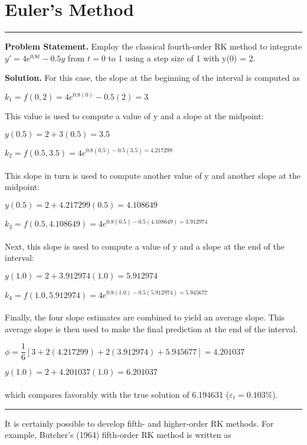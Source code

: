 \documentclass[../main.tex]{subfiles}
\begin{document}
\vspace{0,3in}
\section{Euler's Method}
\vspace{0,1in}
\hrule
\vspace{0,1in}
\textbf{Problem Statement.} Employ the classical fourth-order RK method to integrate $y' = 4e^{0.8t} - 0.5y$ from $t=0$ to 1 using a step size of 1 with y(0) = 2.

\vspace{0.2in}
\textbf{Solution.}  For this case, the slope at the beginning of the interval is computed as 

$k_1 = f(0,2) = 4e^{0.8(0)} - 0.5(2) = 3$

This value is used to compute a value of y and a slope at the midpoint:

$y(0.5) = 2 + 3(0.5) = 3.5$

$k_2 = f(0.5, 3.5) = 4e^{0.8(0.5) - 0.5(3.5) = 4.217299}$\\
\\
This slope in turn is used to compute another value of y and another slope at the midpoint:

$y(0.5) = 2 + 4.217299(0.5) = 4.108649$

$k_3 = f (0.5, 4.108649) = 4e^{0.8(0.5) − 0.5(4.108649) = 3.912974}$\\
\\
Next, this slope is used to compute a value of y and a slope at the end of the interval:

$y(1.0) = 2 + 3.912974(1.0) = 5.912974$

$k_4 = f (1.0, 5.912974) = 4e^{0.8(1.0) - 0.5(5.912974) = 5.945677}$\\
\\
Finally, the four slope estimates are combined to yield an average slope. This average slope
is then used to make the final prediction at the end of the interval.

$\phi = \dfrac{1}{6} [3 + 2(4.217299) + 2(3.912974) + 5.945677] = 4.201037$

$y(1.0) = 2 + 4.201037(1.0) = 6.201037$\\
\\
which compares favorably with the true solution of 6.194631 ($\varepsilon_{t} = 0.103\%$).
\hrule

\vspace{0.2in}
It is certainly possible to develop fifth- and higher-order RK methods. For example,
Butcher's (1964) fifth-order RK method is written as
\end{document}
